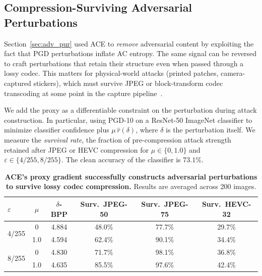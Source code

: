 \documentclass{article}
\theoremstyle{definition}
\begin{document}
\subsection{Compression-Surviving Adversarial Perturbations}
\label{sec:survival}

Section~\ref{sec:adv_pur} used ACE to \emph{remove} adversarial content by exploiting the fact that PGD perturbations inflate AC entropy.
The same signal can be reversed to craft perturbations that retain their structure even when passed through a lossy codec.
This matters for physical-world attacks (printed patches, camera-captured stickers), which must survive JPEG or block-transform codec transcoding at some point in the capture pipeline~\citep{shin2017jpeg}.

We add the proxy as a differentiable constraint on the perturbation during attack construction.
In particular, using PGD-10 on a ResNet-50 ImageNet classifier to minimize classifier confidence plus $\mu\,\hat{r}(\delta)$, where $\delta$ is the perturbation itself.
We measure the \emph{survival rate}, the fraction of pre-compression attack strength retained after JPEG or HEVC compression for $\mu\in\{0,1.0\}$ and $\varepsilon\in\{4/255,8/255\}$.
The clean accuracy of the classifier is $73.1\%$.

\begin{table}[h]
  \centering
  \small
  \caption{
  \textbf{ACE's proxy gradient successfully constructs adversarial perturbations to survive lossy codec compression.}
  Results are averaged across 200 images.}
  \label{tab:survival}
  \begin{tabular}{lccccc}
    \toprule
    $\varepsilon$ & $\mu$ & $\delta$-BPP & Surv.\ JPEG-50 & Surv.\ JPEG-75 & Surv.\ HEVC-32 \\
    \midrule
    \multirow{2}{*}{4/255}
      & 0 & 4.884 & 48.0\% & 77.7\% & 29.7\% \\
      & 1.0              & 4.594 & 62.4\% & 90.1\% & 34.4\% \\
      \midrule
    \multirow{2}{*}{8/255}
      & 0 & 4.830 & 71.7\% & 98.1\% & 36.8\% \\
      & 1.0              & 4.635 & 85.5\% & 97.6\% & 42.4\% \\
    \bottomrule
  \end{tabular}
\end{table}
\end{document}
